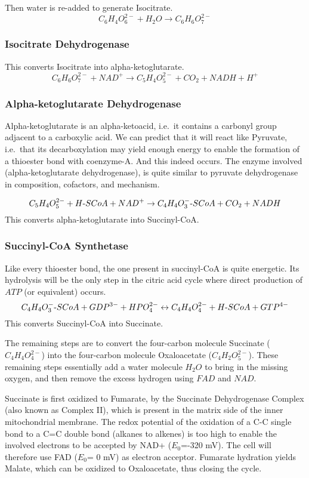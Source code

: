 \documentclass{article}
\def\mhyphen{{\hbox{-}}}
\begin{document}
Then water is re-added to generate Isocitrate.
\[
    C_6H_4O_6^{2-} + H_2O \rightarrow C_6H_6O_7^{2-}
\]

\subsubsection{Isocitrate Dehydrogenase}
This converts Isocitrate into alpha-ketoglutarate.
\[
    C_6H_6O_7^{2-} + NAD^+ \rightarrow C_5H_4O_5^{2-} + CO_2 + NADH + H^+
\]

\subsubsection{Alpha-ketoglutarate Dehydrogenase}
Alpha-ketoglutarate is an alpha-ketoacid, i.e.\ it contains a carbonyl group adjacent to a
carboxylic acid. We can predict that it will react like Pyruvate, i.e.\ that its
decarboxylation may yield enough energy to enable the formation of a thioester bond with
coenzyme-A. And this indeed occurs. The enzyme involved (alpha-ketoglutarate dehydrogenase),
is quite similar to pyruvate dehydrogenase in composition, cofactors, and mechanism.

\[
    C_5H_4O_5^{2-} + H{\mhyphen}SCoA + NAD^+ \rightarrow
    C_4H_4O_3^{-}{\mhyphen}SCoA + CO_2 + NADH
\]
This converts alpha-ketoglutarate into Succinyl-CoA.

\subsubsection{Succinyl-CoA Synthetase}
Like every thioester bond, the one present in succinyl-CoA is quite energetic. Its
hydrolysis will be the only step in the citric acid cycle where direct production of
$\mathit{ATP}$ (or equivalent) occurs.
\[
    C_4H_4O_3^{-}{\mhyphen}SCoA + GDP^{3-} + HPO_4^{2-} \leftrightarrow
    C_4H_4O_4^{2-} + H{\mhyphen}SCoA + GTP^{4-}
\]
This converts Succinyl-CoA into Succinate.

The remaining steps are to convert the four-carbon molecule Succinate ($C_4H_4O_4^{2-}$)
into the four-carbon molecule Oxaloacetate ($C_4H_2O_5^{2-}$). These remaining steps
essentially add a water molecule $H_2O$ to bring in the missing oxygen, and then remove
the excess hydrogen using $FAD$ and $NAD$.

Succinate is first oxidized to
Fumarate, by the Succinate Dehydrogenase Complex (also known as Complex II), which is
present in the matrix side of the inner mitochondrial membrane. The redox potential of the
oxidation of a C-C single bond to a C=C double bond (alkanes to alkenes) is too high to
enable the involved electrons to be accepted by NAD+ ($E_0$=-320 mV). The cell will therefore
use FAD ($E_0$= 0 mV) as electron acceptor. Fumarate hydration yields Malate, which can be
oxidized to Oxaloacetate, thus closing the cycle.
\end{document}
